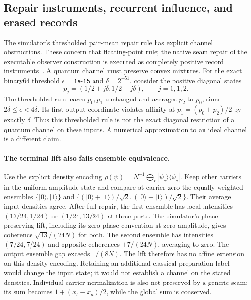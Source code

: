\subsection{Repair instruments, recurrent influence, and erased records}
\label{sec:source-repair-instrument}

The simulator's thresholded pair-mean repair rule has explicit channel
obstructions. These concern that floating-point rule; the native seam repair
of the executable observer construction is executed as completely positive
record instruments~\cite{ophmodel}.
A quantum channel must preserve convex mixtures. For the exact
binary64 threshold $\epsilon=\texttt{1e-15}$ and $\delta=2^{-51}$, consider
the positive diagonal states
\[
 p_j=(1/2+j\delta,1/2-j\delta),\qquad j=0,1,2.
\]
The thresholded rule leaves $p_0,p_1$ unchanged and averages $p_2$ to $p_0$,
since $2\delta\leq\epsilon<4\delta$. Its first output coordinate violates
affinity at $p_1=(p_0+p_2)/2$ by exactly $\delta$. Thus this thresholded
rule is not the exact diagonal restriction of a quantum channel on these
inputs. A numerical approximation to an ideal channel is a different claim.

\paragraph{The terminal lift also fails ensemble equivalence.}
Use the explicit density encoding
$\rho(\psi)=N^{-1}\bigoplus_c|\psi_c\rangle\langle\psi_c|$.
Keep other carriers in the uniform amplitude state and compare at carrier
zero the equally weighted ensembles $\{|0\rangle,|1\rangle\}$ and
$\{(|0\rangle+|1\rangle)/\sqrt2,(|0\rangle-|1\rangle)/\sqrt2\}$.
Their average input densities agree. After full repair, the first ensemble
has local intensities $(13/24,1/24)$ or $(1/24,13/24)$ at these ports.
The simulator's phase-preserving lift, including its zero-phase convention at
zero amplitude, gives coherence $\sqrt{13}/(24N)$ for both. The second
ensemble has intensities $(7/24,7/24)$ and opposite coherences
$\pm7/(24N)$, averaging to zero. The output ensemble gap exceeds
$1/(8N)$. The lift therefore has no affine extension on this density
encoding. Retaining an additional classical preparation label would change
the input state; it would not establish a channel on the stated densities.
Individual carrier normalization is also not preserved by a generic seam:
its sum becomes $1+(x_b-x_a)/2$, while the global sum is conserved.

